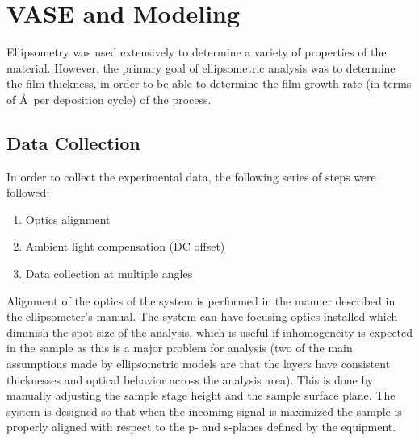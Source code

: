 \section{VASE and Modeling}

Ellipsometry was used extensively to determine a variety of properties of the material. However, the primary goal of ellipsometric analysis was to determine the film thickness, in order to be able to determine the film growth rate (in terms of \AA\ per deposition cycle) of the process. 


\subsection{Data Collection}

In order to collect the experimental data, the following series of steps were followed:

\begin{enumerate}
	\item
	Optics alignment
	\item
	Ambient light compensation (DC offset)
	\item
	Data collection at multiple angles
\end{enumerate}

Alignment of the optics of the system is performed in the manner described in the ellipsometer's manual.\cite{WVASE-manual} The system can have focusing optics installed which diminish the spot size of the analysis, which is useful if inhomogeneity is expected in the sample as this is a major problem for analysis (two of the main assumptions made by ellipsometric models are that the layers have consistent thicknesses and optical behavior across the analysis area). This is done by manually adjusting the sample stage height and the sample surface plane. The system is designed so that when the incoming signal is maximized the sample is properly aligned with respect to the p- and s-planes defined by the equipment. 

